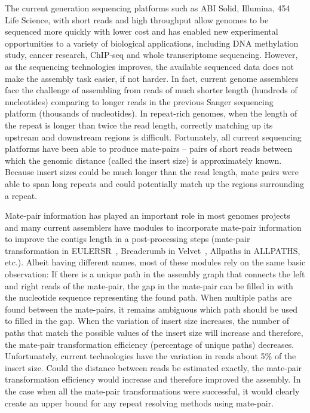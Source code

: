 \documentclass[12pt,a4paper,oneside]{article}
\begin{document}
The current generation sequencing platforms such as ABI Solid, Illumina, 454 Life Science,
with short reads and high throughput allow genomes to be sequenced more quickly with lower cost and
has enabled new experimental opportunities to a variety of biological applications, including DNA methylation study, cancer research,
 ChIP-seq and whole transcriptome sequencing. However, as the sequencing technologies improves, 
the available sequenced data does not make the assembly task easier, if not harder. In fact, current genome 
assemblers face the challenge of assembling from reads of much shorter length (hundreds of 
nucleotides) comparing to longer reads in the previous Sanger sequencing platform
(thousands of nucleotides). In repeat-rich genomes, when the length of the repeat
is longer than twice the read length, correctly matching up its upstream and downstream regions is difficult.
Fortunately, all current sequencing platforms have been able to produce mate-pairs --
pairs of short reads between which the genomic distance (called the insert size) is approximately
known. Because insert sizes could be much longer than the read length, mate
pairs were able to span long repeats and could potentially match up the regions
surrounding a repeat. 


Mate-pair information has played an important role in 
most genomes projects and many current assemblers have  modules to incorporate mate-pair
information to improve the contigs length in a post-processing steps (mate-pair transformation 
in EULERSR~\cite{Chaisson08}, Breadcrumb in Velvet~\cite{Zerbino08}, Allpaths in ALLPATHS\cite{Butler08}, etc.). Albeit having 
different names, most of these modules rely on the same basic observation: If there is a unique
path in the assembly graph that connects the left and right reads of the mate-pair, the gap in the 
mate-pair can be filled in with the nucleotide sequence representing the found path. 
When multiple paths are found between the mate-pairs, it remains ambiguous which path 
should be used to filled in the gap. When the variation of insert size increases, 
the number of paths that match the possible values of the insert size will increase and
therefore, the mate-pair transformation efficiency (percentage of unique paths) decreases. Unfortunately,
current technologies have the variation in reads about 5\% of the insert size. 
Could the distance between reads be estimated exactly, the mate-pair transformation efficiency would 
increase and therefore improved the assembly. In the case when all the mate-pair transformations 
were successful, it would clearly create an upper bound for any repeat resolving methods using mate-pair. 
\end{document}
